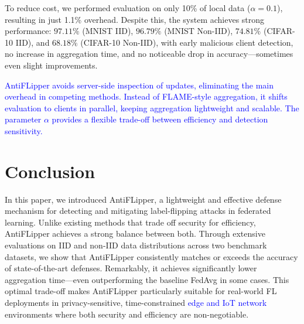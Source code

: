 \documentclass[conference]{IEEEtran}
\begin{document}
To reduce cost, we performed evaluation on only 10\% of local data ($\alpha = 0.1$), resulting in just 1.1\% overhead. Despite this, the system achieves strong performance: $97.11\%$ (MNIST IID), $96.79\%$ (MNIST Non-IID), $74.81\%$ (CIFAR-10 IID), and $68.18\%$ (CIFAR-10 Non-IID), with early malicious client detection, no increase in aggregation time, and no noticeable drop in accuracy—sometimes even slight improvements. 

\textcolor{blue}{AntiFLipper avoids server-side inspection of updates, eliminating the main overhead in competing methods. Instead of FLAME-style aggregation, it shifts evaluation to clients in parallel, keeping aggregation lightweight and scalable. The parameter $\alpha$ provides a flexible trade-off between efficiency and detection sensitivity.}


\section{Conclusion}
\label{sec:conclusion}

In this paper, we introduced AntiFLipper, a lightweight and effective defense mechanism for detecting and mitigating label-flipping attacks in federated learning. Unlike existing methods that trade off security for efficiency, AntiFLipper achieves a strong balance between both. Through extensive evaluations on IID and non-IID data distributions across two benchmark datasets, we show that AntiFLipper consistently matches or exceeds the accuracy of state-of-the-art defenses. Remarkably, it achieves significantly lower aggregation time—even outperforming the baseline FedAvg in some cases. This optimal trade-off makes AntiFLipper particularly suitable for real-world FL deployments in privacy-sensitive, time-constrained \textcolor{blue}{edge and IoT network} environments where both security and efficiency are non-negotiable.




\end{document}

